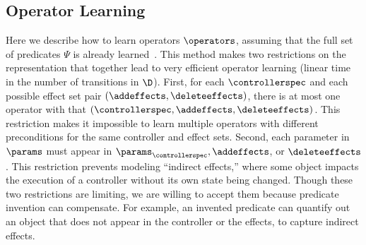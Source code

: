\subsection{Operator Learning}
\label{subsec:oplearning}
Here we describe how to learn operators $\operators$, assuming that the full set of predicates $\Psi$ is already learned~\cite{chitnis2021learning}.
This method makes two restrictions on the representation that together lead to very efficient operator learning (linear time in the number of transitions in $\D$).
First, for each $\controllerspec$ and each possible effect set pair $(\addeffects, \deleteeffects)$, there is at most one operator with that $(\controllerspec, \addeffects, \deleteeffects)$.
This restriction makes it impossible to learn multiple operators with different preconditions for the same controller and effect sets.
Second, each parameter in $\params$ must appear in $\params_{\controllerspec}, \addeffects$, or $\deleteeffects$.
This restriction prevents modeling ``indirect effects,'' where some object impacts the execution of a controller without its own state being changed.
Though these two restrictions are limiting, we are willing to accept them because predicate invention can compensate.
For example, an invented predicate can quantify out an object that does not appear in the controller or the effects, to capture indirect effects.


